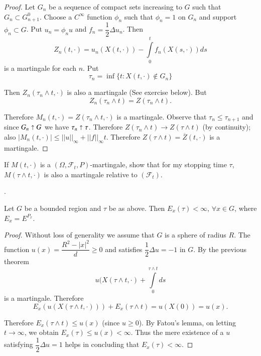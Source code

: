 \begin{proof}
Let $G_{n}$ be a sequence of compact sets increasing to $G$ such that
$G_{n}\subset G^{0}_{n+1}$. Choose a $C^{\infty}$ function $\phi_{n}$
such that $\phi_{n}=1$ on $G_{n}$ and support $\phi_{n}\subset G$. Put
$u_{n}=\phi_{n}u$ and $f_{n}=\dfrac{1}{2}\Delta u_{n}$. Then
$$
Z_{n}(t,\cdot)=u_{n}(X(t,\cdot))-\int\limits^{t}_{0}f_{n}(X(s,\cdot))ds
$$
is a martingale for each $n$. Put
$$
\tau_{n}=\inf \{t:X(t,\cdot)\not\in G_{n}\}
$$

Then $Z_{n}(\tau_{n}\wedge t,\cdot)$ is also a martingale (See
exercise below). But 
$$
Z_{n}(\tau_{n}\wedge t)=Z(\tau_{n}\wedge t).
$$

Therefore $M_{n}(t,\cdot)=Z(\tau_{n}\wedge t,\cdot)$ is a
martingale. Observe that $\tau_{n}\leq \tau_{n+1}$ and since
$G_{n}\shortuparrow G$ we have $\tau_{n}\shortuparrow \tau$. Therefore
$Z(\tau_{n}\wedge t)\to Z(\tau\wedge t)$ (by continuity); also
$|M_{n}(t,\cdot)|\leq ||u||_{\infty}+||f||_{\infty}t$. Therefore
$Z(\tau\wedge t)=\overline{Z}(t,\cdot)$ is a martingale.
\end{proof}

\begin{exer*}
If $M(t,\cdot)$ is a $(\Omega,\mathscr{F}_{t},P)$-martingale, show
that for my stopping time $\tau$, $M(\tau\wedge t,\cdot)$ is also a
martingale relative to $(\mathscr{F}_{t})$. 

\noindent
[Hint: One has to show that if $t_{2}>t_{1}$,
$$
\int\limits_{A}M(\tau\wedge t_{2},w)dP(w)=\int\limits_{A}M(\tau\wedge
t_{1},w)dP(w),\forall A\in \mathscr{F}_{t_{1}}.
$$

The right side =
$$
\int\limits_{A\cap (\tau>t_{1})}M(t_{1},w)dP(w)+\int\limits_{A\cap
  (\tau<t_{1})}M(\tau,w)dP(w). 
$$

The\pageoriginale left side
$$
=\int\limits_{A\cap (\tau>t_{1})}M(t_{2},w)dP(w)+\int\limits_{A\cap
  (\tau<t_{1})}M(\tau,w)dP(w). 
$$

Now use optional stopping theorem].
\end{exer*}

\begin{lemma*}
Let $G$ be a bounded region and $\tau$ be as above. Then
$E_{x}(\tau)<\infty$, $\forall x\in G$, where $E_{x}=E^{P_{x}}$.
\end{lemma*}

\begin{proof}
Without loss of generality we assume that $G$ is a sphere of radius
$R$. The function $u(x)=\dfrac{R^{2}-|x|^{2}}{d}\geq 0$ and satisfies
$\dfrac{1}{2}\Delta u=-1$ in $G$. By the previous theorem
$$
u(X(\tau\wedge t,\cdot)+\int\limits^{\tau\wedge t}_{0}ds
$$
is a martingale. Therefore
$$
E_{x}(u(X(\tau\wedge t,\cdot)))+E_{x}(\tau\wedge t)=u(X(0))=u(x).
$$

Therefore $E_{x}(\tau\wedge t)\leq u(x)$ (since $u\geq 0$). By Fatou's
lemma, on letting $t\to \infty$, we obtain $E_{x}(\tau)\leq
u(x)<\infty$. Thus the mere existence of a $u$ satisfying
$\dfrac{1}{2}\Delta u=1$ helps in concluding that
$E_{x}(\tau)<\infty$. 
\end{proof}

